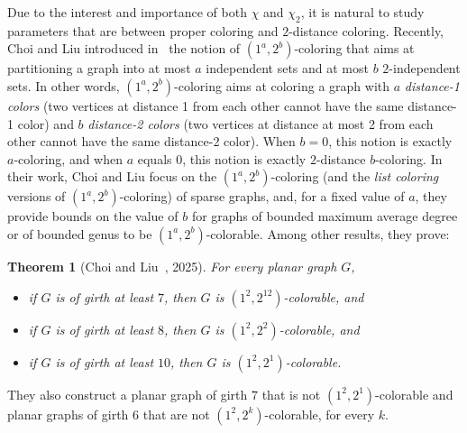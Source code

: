 \documentclass{article}
\newtheorem{theorem}{Theorem}
\newcommand{\colo}[2]{(1^{#1}, 2^{#2})}
\begin{document}
Due to the interest and importance of both $\chi$ and $\chi_2$, it is natural to study parameters that are between proper coloring and $2$-distance coloring. Recently, Choi and Liu introduced in~\cite{choi2025propersquarecoloringssparse} the notion of $\colo{a}{b}$-coloring that aims at partitioning a graph into at most $a$ independent sets and at most $b$ $2$-independent sets. In other words, $\colo{a}{b}$-coloring aims at coloring a graph with $a$ \emph{distance-1 colors} (two vertices at distance 1 from each other cannot have the same distance-1 color) and $b$ \emph{distance-2 colors} (two vertices at distance at most 2 from each other cannot have the same distance-2 color). When $b = 0$, this notion is exactly $a$-coloring, and when $a$ equals $0$, this notion is exactly $2$-distance $b$-coloring. In their work, Choi and Liu focus on the $\colo{a}{b}$-coloring (and the \emph{list coloring} versions of $\colo{a}{b}$-coloring) of sparse graphs, and, for a fixed value of $a$, they provide bounds on the value of $b$ for graphs of bounded maximum average degree or of bounded genus to be $\colo{a}{b}$-colorable. Among other results, they prove:  

\begin{theorem}[Choi and Liu~\cite{choi2025propersquarecoloringssparse}, 2025]\label{thm:choi_and_liu}
    For every planar graph $G$,
    \begin{itemize}
        \item if $G$ is of girth at least $7$, then $G$ is $\colo{2}{12}$-colorable, and
        \item if $G$ is of girth at least $8$, then $G$ is $\colo{2}{2}$-colorable, and
        \item if $G$ is of girth at least $10$, then $G$ is $\colo{2}{1}$-colorable.
    \end{itemize}
\end{theorem}

They also construct a planar graph of girth $7$ that is not $\colo{2}{1}$-colorable and planar graphs of girth $6$ that are not $\colo{2}{k}$-colorable, for every $k$.
\end{document}

